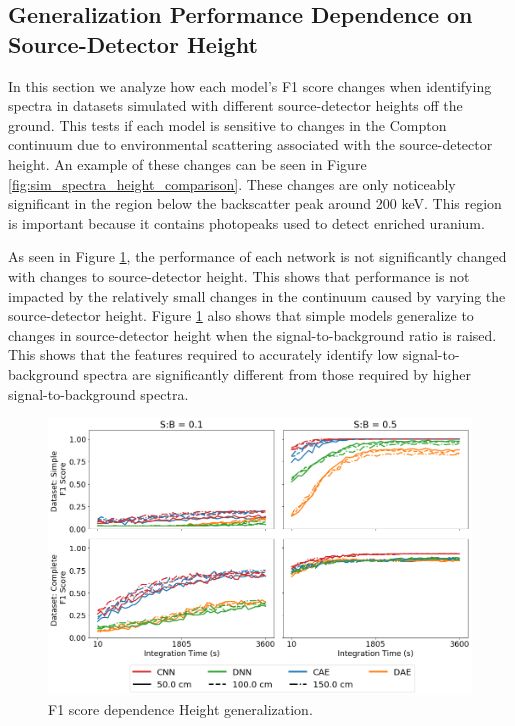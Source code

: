 \subsection{Generalization Performance Dependence on Source-Detector Height}

In this section we analyze how each model's F1 score changes when identifying spectra in datasets simulated with different source-detector heights off the ground. This tests if each model is sensitive to changes in the Compton continuum due to environmental scattering associated with the source-detector height. An example of these changes can be seen in Figure \ref{fig:sim_spectra_height_comparison}. These changes are only noticeably significant in the region below the backscatter peak around 200 keV. This region is important because it contains photopeaks used to detect enriched uranium.

As seen in Figure \ref{fig:sim-generalization-height}, the performance of each network is not significantly changed with changes to source-detector height. This shows that performance is not impacted by the relatively small changes in the continuum caused by varying the source-detector height. Figure \ref{fig:sim-generalization-height} also shows that simple models generalize to changes in source-detector height when the signal-to-background ratio is raised. This shows that the features required to accurately identify low signal-to-background spectra are significantly different from those required by higher signal-to-background spectra. 


\begin{figure}[H]
	\centering
	\includegraphics[width=1.0\linewidth]{images/sim-generalization-height}
	\caption{F1 score dependence Height generalization.}
	\label{fig:sim-generalization-height}
\end{figure}


